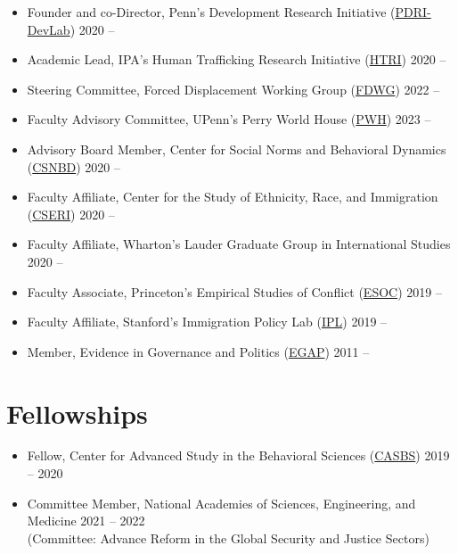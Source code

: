 \documentclass[10pt,a4paper]{article}
\begin{document}
\begin{itemize}[leftmargin=1em, itemsep=2pt, topsep=2pt]
    \item[] Founder and co-Director, Penn's Development Research Initiative (\href{https://pdri-devlab.upenn.edu/}{PDRI-DevLab}) \hfill \textcolor{secondary}{2020 --}
    \item[] Academic Lead, IPA's Human Trafficking Research Initiative (\href{https://poverty-action.org/human-trafficking}{HTRI}) \hfill \textcolor{secondary}{2020 --}
    \item[] Steering Committee, Forced Displacement Working Group (\href{https://pdri-devlab.upenn.edu/forced-displacement-working-group/}{FDWG}) \hfill \textcolor{secondary}{2022 --}
    \item[] Faculty Advisory Committee, UPenn's Perry World House (\href{https://global.upenn.edu/perryworldhouse}{PWH}) \hfill \textcolor{secondary}{2023 --}
    \item[] Advisory Board Member, Center for Social Norms and Behavioral Dynamics (\href{https://normsandbehavior.sas.upenn.edu}{CSNBD}) \hfill \textcolor{secondary}{2020 --}
    \item[] Faculty Affiliate, Center for the Study of Ethnicity, Race, and Immigration (\href{https://cseri.sas.upenn.edu/}{CSERI}) \hfill \textcolor{secondary}{2020 --}
    \item[] Faculty Affiliate, Wharton's Lauder Graduate Group in International Studies \hfill \textcolor{secondary}{2020 --}
    \item[] Faculty Associate, Princeton's Empirical Studies of Conflict (\href{https://esoc.princeton.edu}{ESOC}) \hfill \textcolor{secondary}{2019 --}
    \item[] Faculty Affiliate, Stanford's Immigration Policy Lab (\href{https://immigrationlab.org}{IPL}) \hfill \textcolor{secondary}{2019 --}
    \item[] Member, Evidence in Governance and Politics (\href{https://egap.org}{EGAP}) \hfill \textcolor{secondary}{2011 --}
\end{itemize}

\section{Fellowships}

\begin{itemize}[leftmargin=1em, itemsep=2pt, topsep=2pt]
    \item[] Fellow, Center for Advanced Study in the Behavioral Sciences (\href{https://casbs.stanford.edu}{CASBS}) \hfill \textcolor{secondary}{2019 -- 2020}
    \item[] Committee Member, National Academies of Sciences, Engineering, and Medicine \hfill \textcolor{secondary}{2021 -- 2022}\\
    \textcolor{secondary}{\small (Committee: Advance Reform in the Global Security and Justice Sectors)}
\end{itemize}
\end{document}
